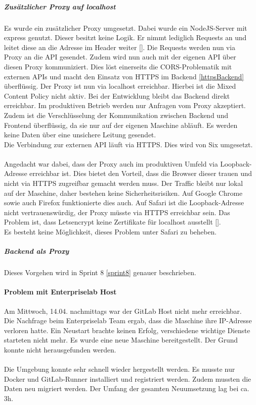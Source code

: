 \subparagraph{Zusätzlicher Proxy auf localhost}\label{corsLocalhost}
Es wurde ein zusätzlicher Proxy umgesetzt. Dabei wurde ein NodeJS-Server mit express genutzt. Dieser besitzt keine Logik. Er nimmt lediglich Requests an und leitet diese an die Adresse im Header weiter [\cite{corsProxy}]. Die Requests werden nun via Proxy an die API gesendet. Zudem wird nun auch mit der eigenen API über diesen Proxy kommuniziert. Dies löst einerseits die \ac{CORS}-Problematik mit externen APIs und macht den Einsatz von HTTPS im Backend \ref{httpsBackend} überflüssig. Der Proxy ist nun via localhost erreichbar. Hierbei ist die Mixed Content Policy nicht aktiv. Bei der Entwicklung bleibt das Backend direkt erreichbar. Im produktiven Betrieb werden nur Anfragen vom Proxy akzeptiert. \\
Zudem ist die Verschlüsselung der Kommunikation zwischen Backend und Frontend überflüssig, da sie nur auf der eigenen Maschine abläuft. Es werden keine Daten über eine unsichere Leitung gesendet. \\
Die Verbindung zur externen API läuft via HTTPS. Dies wird von Six umgesetzt.\\\\
Angedacht war dabei, dass der Proxy auch im produktiven Umfeld via Loopback-Adresse erreichbar ist. Dies bietet den Vorteil, dass die Browser dieser trauen und nicht via HTTPS zugreifbar gemacht werden muss. Der Traffic bleibt nur lokal auf der Maschine, daher bestehen keine Sicherheitsrisiken. Auf Google Chrome sowie auch Firefox funktionierte dies auch. Auf Safari ist die Loopback-Adresse nicht vertrauenswürdig, der Proxy müsste via HTTPS erreichbar sein. Das Problem ist, dass Letsencrypt keine Zertifikate für localhost ausstellt [\cite{letsencryptLocalhost}].\\
Es besteht keine Möglichkeit, dieses Problem unter Safari zu beheben. 

\subparagraph{Backend als Proxy}
Dieses Vorgehen wird in Sprint 8 \ref{sprint8} genauer beschrieben. 
\paragraph{Problem mit Enterpriselab Host}
Am Mittwoch, 14.04. nachmittags war der GitLab Host nicht mehr erreichbar. Die Nachfrage beim Enterpriselab Team ergab, dass die Maschine ihre IP-Adresse verloren hatte. Ein Neustart brachte keinen Erfolg, verschiedene wichtige Dienste starteten nicht mehr. Es wurde eine neue Maschine bereitgestellt. Der Grund konnte nicht herausgefunden werden. \\\\
Die Umgebung konnte sehr schnell wieder hergestellt werden. Es musste nur Docker und GitLab-Runner installiert und registriert werden. Zudem mussten die Daten neu migriert werden. Der Umfang der gesamten Neuumsetzung lag bei ca. 3h. 

